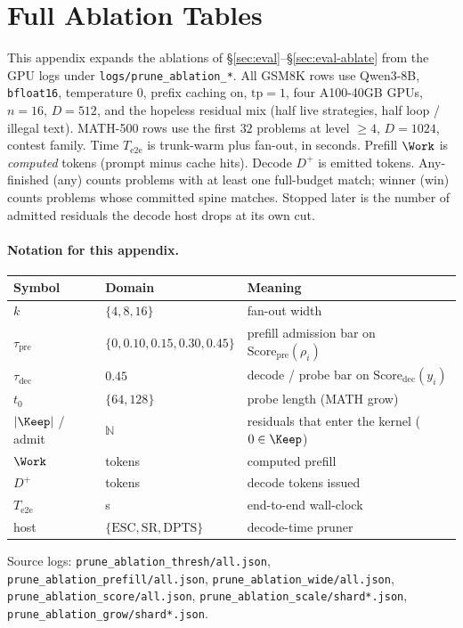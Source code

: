 \section{Full Ablation Tables}
\label{sec:ablation-full}

This appendix expands the ablations of \S\ref{sec:eval}--\S\ref{sec:eval-ablate}
from the GPU logs under \texttt{logs/prune\_ablation\_*}.
All GSM8K rows use Qwen3-8B, \texttt{bfloat16}, temperature $0$, prefix caching on,
$\mathrm{tp}{=}1$, four A100-40GB GPUs, $n{=}16$, $D{=}512$, and the hopeless residual mix
(half live strategies, half loop / illegal text).
MATH-500 rows use the first $32$ problems at level $\ge 4$, $D{=}1024$, contest family.
Time $T_{\mathrm{e2e}}$ is trunk-warm plus fan-out, in seconds.
Prefill $\Work$ is \emph{computed} tokens (prompt minus cache hits).
Decode $D^{+}$ is emitted tokens.
Any-finished (any) counts problems with at least one full-budget match;
winner (win) counts problems whose committed spine matches.
Stopped later is the number of admitted residuals the decode host drops at its own cut.

\paragraph{Notation for this appendix.}
\begin{center}
\scriptsize
\begin{tabular}{@{}llp{}@{}}
\toprule
Symbol & Domain & Meaning \\
\midrule
$k$ & $\{4,8,16\}$ & fan-out width \\
$\tau_{\mathrm{pre}}$ & $\{0,0.10,0.15,0.30,0.45\}$ & prefill admission bar on $\mathrm{Score}_{\mathrm{pre}}(\rho_i)$ \\
$\tau_{\mathrm{dec}}$ & $0.45$ & decode / probe bar on $\mathrm{Score}_{\mathrm{dec}}(y_i)$ \\
$t_0$ & $\{64,128\}$ & probe length (MATH grow) \\
$|\Keep|$ / admit & $\mathbb{N}$ & residuals that enter the kernel ($0\in\Keep$) \\
$\Work$ & tokens & computed prefill \\
$D^{+}$ & tokens & decode tokens issued \\
$T_{\mathrm{e2e}}$ & s & end-to-end wall-clock \\
host & $\{\mathrm{ESC},\mathrm{SR},\mathrm{DPTS}\}$ & decode-time pruner \\
\bottomrule
\end{tabular}
\end{center}
Source logs: \texttt{prune\_ablation\_thresh/all.json},
\texttt{prune\_ablation\_prefill/all.json},
\texttt{prune\_ablation\_wide/all.json},
\texttt{prune\_ablation\_score/all.json},
\texttt{prune\_ablation\_scale/shard*.json},
\texttt{prune\_ablation\_grow/shard*.json}.

